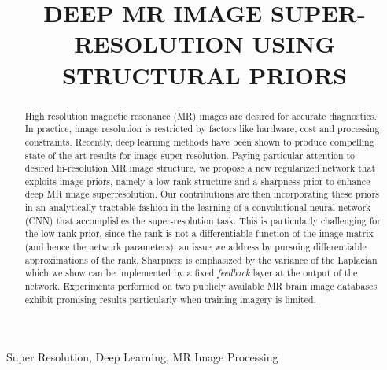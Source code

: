 \documentclass{article}
\title{DEEP MR IMAGE SUPER-RESOLUTION USING STRUCTURAL PRIORS }
\def\sqz{\vspace{-3pt}}
\begin{document}
%
\maketitle
%

\begin{abstract}
High resolution magnetic resonance (MR) images are desired for accurate diagnostics. In practice, image resolution is restricted by factors like hardware, cost and processing constraints. Recently, deep learning methods have been shown to produce compelling state of the art results for image super-resolution. Paying particular attention to desired hi-resolution MR image structure, we propose a new regularized network that exploits image priors, namely a low-rank structure and a sharpness prior to enhance deep MR image superresolution.  Our contributions are then incorporating these priors in an analytically tractable fashion in the learning of a convolutional neural network (CNN) that accomplishes the super-resolution task. This is particularly challenging for the low rank prior, since the rank is not a differentiable function of the image matrix (and hence the network parameters), an issue we address by pursuing differentiable approximations of the rank. Sharpness is emphasized by the variance of the Laplacian which we show can be implemented by a fixed {\em feedback} layer at the output of the network. Experiments performed on two publicly available MR brain image databases exhibit promising results particularly when training imagery is limited.

\end{abstract}
\sqz
\begin{keywords}
Super Resolution, Deep Learning, MR Image Processing
\end{keywords}
%
\end{document}
